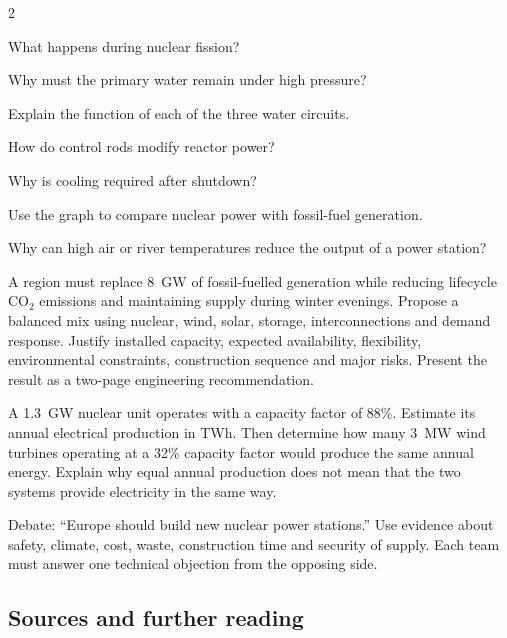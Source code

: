 \begin{multicols}{2}
\begin{questions}
\item What happens during nuclear fission?
\item Why must the primary water remain under high pressure?
\item Explain the function of each of the three water circuits.
\item How do control rods modify reactor power?
\item Why is cooling required after shutdown?
\item Use the graph to compare nuclear power with fossil-fuel generation.
\item Why can high air or river temperatures reduce the output of a power station?
\end{questions}

\begin{challenge}
A region must replace 8~GW of fossil-fuelled generation while reducing lifecycle CO$_2$
emissions and maintaining supply during winter evenings. Propose a balanced mix using
nuclear, wind, solar, storage, interconnections and demand response. Justify installed
capacity, expected availability, flexibility, environmental constraints, construction
sequence and major risks. Present the result as a two-page engineering recommendation.
\end{challenge}

\begin{applicationexercise}
A 1.3~GW nuclear unit operates with a capacity factor of 88\%. Estimate its annual electrical
production in TWh. Then determine how many 3~MW wind turbines operating at a 32\% capacity
factor would produce the same annual energy. Explain why equal annual production does not
mean that the two systems provide electricity in the same way.
\end{applicationexercise}

\begin{speaking}
Debate: ``Europe should build new nuclear power stations.'' Use evidence about safety,
climate, cost, waste, construction time and security of supply. Each team must answer one
technical objection from the opposing side.
\end{speaking}

\end{multicols}

\subsection*{Sources and further reading}
\quad
{}
\quad
{}
